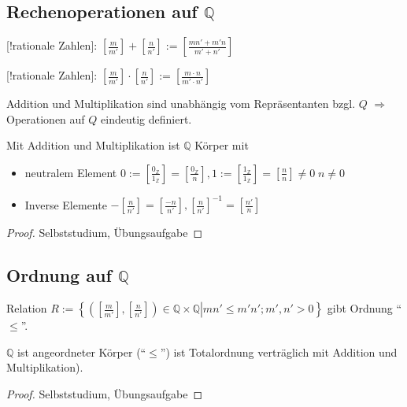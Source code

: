 \subsection{Rechenoperationen auf $\mathbb{Q}$}
\begin{definition}
	[!rationale Zahlen]: $\left[ \frac{m}{m'}\right] + \left[ \frac{n}{n'}\right] := \left[ \frac{mn' + m'n}{m'+n'}\right]$
	
	[!rationale Zahlen]: $\left[\frac{m}{m'}\right]\cdot\left[\frac{n}{n'}\right]:=\left[\frac{m\cdot n}{m'\cdot n'}\right]$
	
	Addition und Multiplikation sind unabhängig vom Repräsentanten bzgl. $Q$ $\Rightarrow$ Operationen auf $Q$ eindeutig definiert.
\end{definition}

\begin{proposition}
	Mit Addition und Multiplikation ist $\mathbb{Q}$ Körper mit
	\begin{itemize}
	\item neutralem Element $0:=\left[\frac{0_\mathbb{Z}}{1_\mathbb{Z}}\right] = \left[\frac{0_\mathbb{Z}}{n}\right], 1 :=\left[\frac{1_\mathbb{Z}}{1_\mathbb{Z}}\right] = \left[ \frac{n}{n}\right] \neq 0\;n\neq 0$
	\item Inverse Elemente $-\left[\frac{n}{n'}\right] = \left[ \frac{-n}{n'}\right], \left[\frac{n}{n'}\right]^{-1} = \left[\frac{n'}{n}\right]$
	\end{itemize}
\end{proposition}
\begin{proof}
	Selbststudium, Übungsaufgabe
\end{proof}

\subsection{Ordnung auf $\mathbb{Q}$}
\begin{definition}
	Relation $R:=\left\lbrace \left. \left( \left[\frac{m}{m'}\right],\left[\frac{n}{n'}\right]\right)\in\mathbb{Q}\times\mathbb{Q} \right| mn'\le m'n'; m',n'>0\right\rbrace$ gibt Ordnung "`$\le$"'.
\end{definition}

\begin{proposition}
	$\mathbb{Q}$ ist angeordneter Körper ("`$\leq$"') ist Totalordnung verträglich mit Addition und Multiplikation).
\end{proposition}
\begin{proof}
	Selbststudium, Übungsaufgabe
\end{proof}

